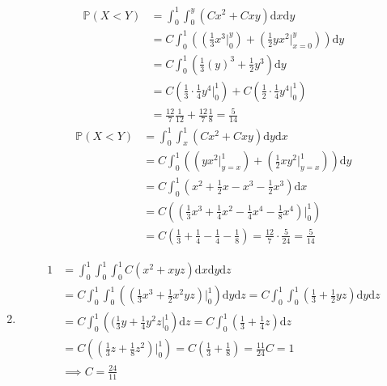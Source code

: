 \begin{enumerate}[label=\alph*.]
\begin{align*}
\mathbb{P}(X < Y) &= \int_0^1 \int_0^y (Cx^2 + Cxy) \mathrm d x \mathrm d y \\
&= C \int_0^1 \left( \left( \frac{1}{3}x^3 \Big|_0^y \right) + \left( \frac{1}{2} y x^2 \Big|_{x=0}^y \right) \right) \mathrm d y \\
&= C \int_0^1 \left( \frac{1}{3} (y)^3 + \frac{1}{2} y^3 \right) \mathrm d y \\
&= C \left(\frac{1}{3}\cdot\frac{1}{4} y^4 \Big|_0^1 \right) + C \left(\frac{1}{2}\cdot\frac{1}{4} y^4 \Big|_0^1 \right) \\
&= \frac{12}{7} \frac{1}{12} + \frac{12}{7} \frac{1}{8} = \frac{5}{14}
\end{align*}
\begin{align*}
\mathbb{P}(X < Y) &= \int_0^1 \int_x^1 \left( C x^2 + C xy \right) \mathrm dy \mathrm dx \\
&= C \int_0^1 \left( \left( yx^2 \Big|_{y=x}^1 \right) + \left(\frac{1}{2} xy^2 \Big|_{y=x}^1 \right) \right) \mathrm d y \\
&= C \int_0^1 \left( x^2 + \frac{1}{2} x - x^3 - \frac{1}{2} x^3 \right) \mathrm d x \\
&= C \left( ( \frac{1}{3}x^3 + \frac{1}{4}x^2 - \frac{1}{4}x^4 - \frac{1}{8}x^4) \Big|_0^1 \right) \\
&= C \left( \frac{1}{3} + \frac{1}{4} - \frac{1}{4} - \frac{1}{8} \right) = \frac{12}{7} \cdot \frac{5}{24} = \frac{5}{14} 
\end{align*}
\item

\begin{align*}
1 &= \int_0^1 \int_0^1 \int_0^1 C \left(x^2 + xyz \right) \mathrm d x \mathrm d y \mathrm d z \\
&= C \int_0^1 \int_0^1 \left( (\frac{1}{3}x^3 + \frac{1}{2}x^2 yz) \Big|_0^1 \right) \mathrm d y \mathrm d z 
= C \int_0^1 \int_0^1 \left( \frac{1}{3} + \frac{1}{2} yz \right) \mathrm d y \mathrm d z \\
&= C \int_0^1 \left( (\frac{1}{3}y + \frac{1}{4} y^2 z \Big|_0^1 \right) \mathrm d z
= C \int_0^1 \left( \frac{1}{3} + \frac{1}{4} z \right) \mathrm d z \\
&= C \left( (\frac{1}{3} z + \frac{1}{8} z^2 ) \Big|_0^1 \right)
= C \left( \frac{1}{3} + \frac{1}{8} \right) = \frac{11}{24} C = 1 \\
&\implies C = \frac{24}{11}
\end{align*}
\end{enumerate}


